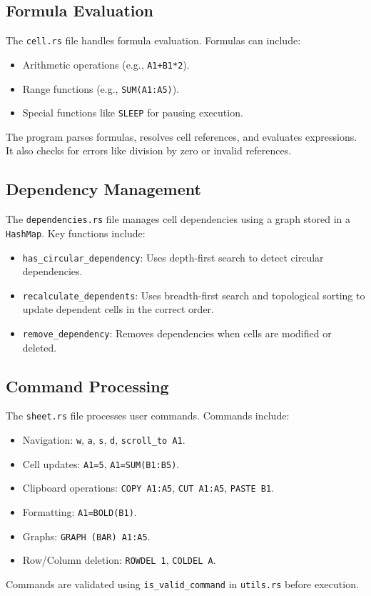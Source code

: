\documentclass[12pt]{article}
\begin{document}
\subsection{Formula Evaluation}
The \texttt{cell.rs} file handles formula evaluation. Formulas can include:
\begin{itemize}
    \item Arithmetic operations (e.g., \texttt{A1+B1*2}).
    \item Range functions (e.g., \texttt{SUM(A1:A5)}).
    \item Special functions like \texttt{SLEEP} for pausing execution.
\end{itemize}
The program parses formulas, resolves cell references, and evaluates expressions. It also checks for errors like division by zero or invalid references.

\subsection{Dependency Management}
The \texttt{dependencies.rs} file manages cell dependencies using a graph stored in a \texttt{HashMap}. Key functions include:
\begin{itemize}
    \item \texttt{has\_circular\_dependency}: Uses depth-first search to detect circular dependencies.
    \item \texttt{recalculate\_dependents}: Uses breadth-first search and topological sorting to update dependent cells in the correct order.
    \item \texttt{remove\_dependency}: Removes dependencies when cells are modified or deleted.
\end{itemize}

\subsection{Command Processing}
The \texttt{sheet.rs} file processes user commands. Commands include:
\begin{itemize}
    \item Navigation: \texttt{w}, \texttt{a}, \texttt{s}, \texttt{d}, \texttt{scroll\_to A1}.
    \item Cell updates: \texttt{A1=5}, \texttt{A1=SUM(B1:B5)}.
    \item Clipboard operations: \texttt{COPY A1:A5}, \texttt{CUT A1:A5}, \texttt{PASTE B1}.
    \item Formatting: \texttt{A1=BOLD(B1)}.
    \item Graphs: \texttt{GRAPH (BAR) A1:A5}.
    \item Row/Column deletion: \texttt{ROWDEL 1}, \texttt{COLDEL A}.
\end{itemize}
Commands are validated using \texttt{is\_valid\_command} in \texttt{utils.rs} before execution.
\end{document}
